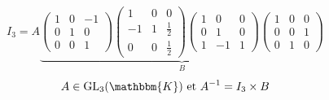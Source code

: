 \begin{exm}
	\begin{align*}
		I_3 = A
		\underbrace{
		\begin{pmatrix}
			1&0&-1\\
			0&1&0\\
			0&0&1
		\end{pmatrix}
		\begin{pmatrix}
			1&0&0\\
			-1&1&\frac{1}{2}\\
			0&0&\frac{1}{2}
		\end{pmatrix}
		\begin{pmatrix}
			1&0&0\\
			0&1&0\\
			1&-1&1
		\end{pmatrix} 
		\begin{pmatrix}
			1&0&0\\
			0&0&1\\
			0&1&0
		\end{pmatrix}}_{B}
	\end{align*}
	\begin{align*}
		A \in \mathrm{GL}_3(\mathbbm{K})\text{ et } A^{-1} = I_3 \times B
	\end{align*}


\end{exm}
